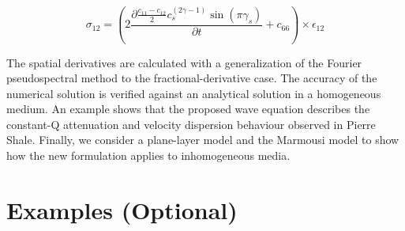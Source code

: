 \documentclass{paris17}
\begin{document}
\begin{equation}
  \sigma_{12} = \left ( 2\frac{\partial \frac{c_{11}-c_{12}}{2}c_s^{(2\gamma-1)}\sin(\pi\gamma_s)}{\partial t} + c_{66} \right )\times \epsilon_{12}
\end{equation}

The spatial derivatives are calculated with a generalization of the Fourier pseudospectral method to the fractional-derivative case. The accuracy of the numerical solution is verified against an analytical solution in a homogeneous medium. An example shows that the proposed wave equation describes the constant-Q attenuation and velocity dispersion behaviour observed in Pierre Shale. Finally, we consider a plane-layer model and the Marmousi model to show how the new formulation applies to inhomogeneous media.

\section{Examples (Optional)}
\end{document}
